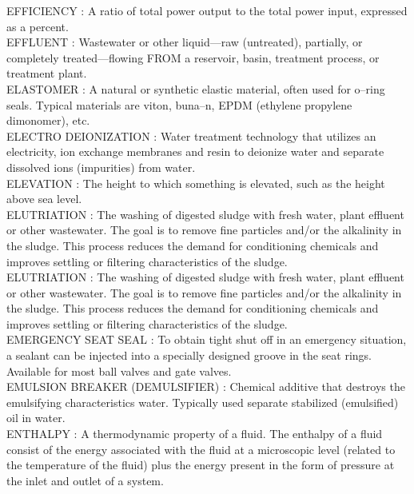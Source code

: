 EFFICIENCY :   A ratio of total power output to the total power input, expressed as a percent.\\
\vspace{0.15cm}
EFFLUENT :  Wastewater or other liquid—raw (untreated), partially, or completely treated—flowing FROM a reservoir, basin, treatment process, or treatment plant. \\
\vspace{0.15cm}
ELASTOMER :   A natural or synthetic elastic material, often used for o–ring seals. Typical materials are viton, buna–n, EPDM (ethylene propylene dimonomer), etc.\\
\vspace{0.15cm}
ELECTRO DEIONIZATION :  Water treatment technology that utilizes an electricity, ion exchange membranes and resin to deionize water and separate dissolved ions (impurities) from water.\\
\vspace{0.15cm}
ELEVATION :  The height to which something is elevated, such as the height above sea level. \\
\vspace{0.15cm}
ELUTRIATION :  The washing of digested sludge with fresh water, plant effluent or other wastewater. The goal is to remove fine particles and/or the alkalinity in the sludge. This process reduces the demand for conditioning chemicals and improves settling or filtering characteristics of the sludge.\\
\vspace{0.15cm}
ELUTRIATION :  The washing of digested sludge with fresh water, plant effluent or other wastewater. The goal is to remove fine particles and/or the alkalinity in the sludge. This process reduces the demand for conditioning chemicals and improves settling or filtering characteristics of the sludge.\\
\vspace{0.15cm}
EMERGENCY SEAT SEAL :   To obtain tight shut off in an emergency situation, a sealant can be injected into a specially designed groove in the seat rings. Available for most ball valves and gate valves.\\
\vspace{0.15cm}
EMULSION BREAKER (DEMULSIFIER) :  Chemical additive that destroys the emulsifying characteristics water. Typically used separate stabilized (emulsified) oil in water.\\
\vspace{0.15cm}
ENTHALPY :   A thermodynamic property of a fluid. The enthalpy of a fluid consist of the energy associated with the fluid at a microscopic level (related to the temperature of the fluid) plus the energy present in the form of pressure at the inlet and outlet of a system.\\
